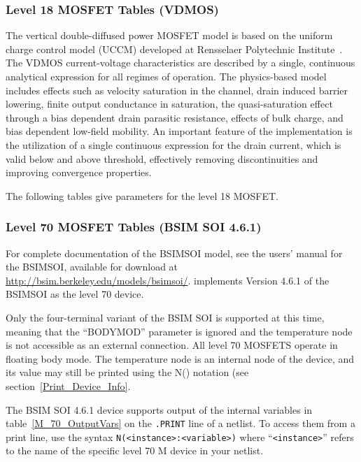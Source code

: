 \subsubsection{Level 18 MOSFET Tables (VDMOS)}
The vertical double-diffused power MOSFET model is based on the uniform charge
control model (UCCM) developed at Rensselaer Polytechnic Institute~\cite{Fjeldly:1998}.
The VDMOS current-voltage characteristics are described by a single, continuous
analytical expression for all regimes of operation.  The physics-based model
includes effects such as velocity saturation in the channel, drain induced barrier
lowering, finite output conductance in saturation, the quasi-saturation effect
through a bias dependent drain parasitic resistance, effects of bulk charge, and
bias dependent low-field mobility.  An important feature of the implementation
is the utilization of a single continuous expression for the drain current, which
is valid below and above threshold, effectively removing discontinuities and
improving convergence properties.

The following tables give parameters for the level 18 MOSFET.




\clearpage
\subsubsection{Level 70 MOSFET Tables (BSIM SOI 4.6.1)}
For complete documentation of the BSIMSOI model, see the users' manual
for the BSIMSOI, available for download at
\url{http://bsim.berkeley.edu/models/bsimsoi/}.
\Xyce{} implements Version 4.6.1 of the BSIMSOI as the level 70 device.

Only the four-terminal variant of the BSIM SOI is supported at this
time, meaning that the ``BODYMOD'' parameter is ignored and the
temperature node is not accessible as an external connection.  All
level 70 MOSFETS operate in floating body mode.  The temperature node
is an internal node of the device, and its value may still be printed
using the N() notation (see section~\ref{Print_Device_Info}.

The BSIM SOI 4.6.1 device supports output of the internal variables in
table~\ref{M_70_OutputVars} on the \texttt{.PRINT} line of a netlist.
To access them from a print line, use the syntax
\texttt{N(<instance>:<variable>)} where ``\texttt{<instance>}'' refers to the
name of the specific level 70 M device in your netlist.

